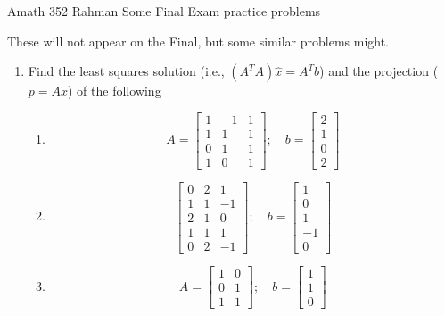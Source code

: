 \documentclass[14pt]{amsart}
\begin{document}
\begin{flushleft}
{\sc \Large Amath 352 Rahman} \hfill Some Final Exam practice problems
\bigskip
\end{flushleft}

These will not appear on the Final, but some similar problems might.

\Large

\begin{enumerate}

\setlength\itemsep{1em}

\item  Find the least squares solution (i.e., $(A^TA)\hat{x} = A^Tb$) and the projection ($p = A\hat{x}$) of the following

\begin{enumerate}

\item
%
\begin{equation*}
A = \begin{bmatrix}
1 & -1 & 1\\
1 & 1 & 1\\
0 & 1 & 1\\
1 & 0 & 1
\end{bmatrix};\quad b = \begin{bmatrix}
2\\
1\\
0\\
2
\end{bmatrix}
\end{equation*}

\item
%
\begin{equation*}
\begin{bmatrix}
0 & 2 & 1\\
1 & 1 & -1\\
2 & 1 & 0\\
1 & 1 &1\\
0 & 2 & -1
\end{bmatrix};\quad b = \begin{bmatrix}
1\\
0\\
1\\
-1\\
0
\end{bmatrix}
\end{equation*}

\item  
%
\begin{equation*}
A = \begin{bmatrix}
1 & 0\\
0 & 1\\
1 & 1
\end{bmatrix};\quad b = \begin{bmatrix}
1\\
1\\
0
\end{bmatrix}
\end{equation*}


\end{enumerate}
\end{enumerate}
\end{document}
